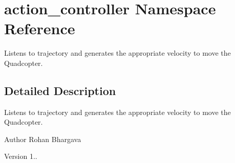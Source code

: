 \hypertarget{namespaceaction__controller}{\section{action\-\_\-controller \-Namespace \-Reference}
\label{namespaceaction__controller}
}


\-Listens to trajectory and generates the appropriate velocity to move the \-Quadcopter.  




\subsection{\-Detailed \-Description}
\-Listens to trajectory and generates the appropriate velocity to move the \-Quadcopter. \begin{DoxyAuthor}{\-Author}
\-Rohan \-Bhargava 
\end{DoxyAuthor}
\begin{DoxyVersion}{\-Version}
1.. 
\end{DoxyVersion}
